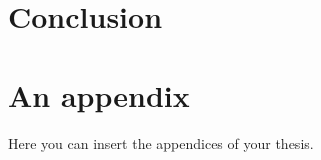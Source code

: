 \documentclass[
  digital, %
  notable,   %
  nolof,     %
  nolot,     %
  draft
]{fithesis3}
\begin{document}
\chapter{Conclusion}






  \printbibliography[heading=bibintoc] %

  \makeatletter\thesis@blocks@clear\makeatother
  \printindex

\appendix %
\chapter{An appendix}
Here you can insert the appendices of your thesis.
\end{document}
